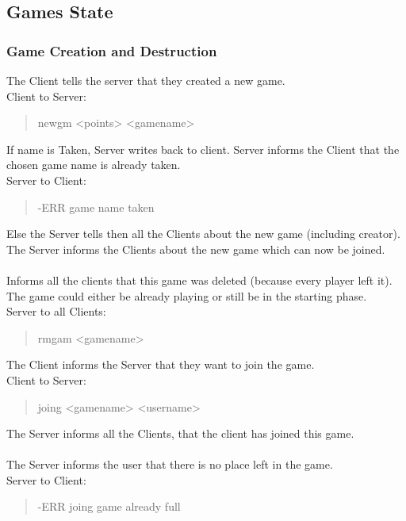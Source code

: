 \documentclass[a4paper,11pt]{article}
\begin{document}
\subsection{Games State}

\subsubsection{Game Creation and Destruction}
The Client tells the server that they created a new game.\\
Client to Server:
\begin{quote}
  newgm <points> <gamename>
\end{quote}

\noindent
If name is Taken, Server writes back to client. Server informs the Client that the chosen game name is already taken.\\
Server to Client:
\begin{quote}
  -ERR game name taken
\end{quote}

\noindent
Else the Server tells then all the Clients about the new game (including creator). The Server informs the Clients about the new game which can now be joined.\\\\

Informs all the clients that this game was deleted (because every player left it).	The game could either be already playing or still be in the starting phase.\\
Server to all Clients:
\begin{quote}
  rmgam <gamename>
\end{quote}

\noindent
The Client informs the Server that they want to join the game.\\
Client to Server:
\begin{quote}
  joing <gamename> <username>
\end{quote}

\noindent
The Server informs all the Clients, that the client has joined this game.\\\\

The Server informs the user that there is no place left in the game.\\
Server to Client:
\begin{quote}
  -ERR joing game already full
\end{quote}
\end{document}
